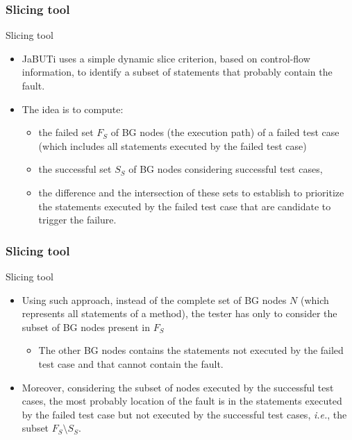 \begin{frame}
\frametitle{Slicing tool}

\begin{block:fact}{Slicing tool}
\begin{itemize}
	\item JaBUTi uses a simple dynamic slice criterion, based on
	control-flow information, to identify a subset of statements that
	probably contain the fault.

	\item The idea is to compute:
	\begin{itemize}
		\item the failed set $F_S$ of BG nodes (the execution path) of a
		failed test case (which includes all statements executed by the failed
		test case)

		\item the successful set $S_S$ of BG nodes considering successful test
		cases,

		\item the difference and the intersection of these sets to establish to
		prioritize the statements executed by the failed test case that are
		candidate to trigger the failure.
	\end{itemize}
\end{itemize}
\end{block:fact}
\end{frame}



\begin{frame}
\frametitle{Slicing tool}

\begin{block:fact}{Slicing tool}
\begin{itemize}
	\item Using such approach, instead of the complete set of BG nodes $N$
	(which represents all statements of a method), the tester has only to
	consider the subset of BG nodes present in $F_S$
	\begin{itemize}
		\item The other BG nodes contains the statements not executed by the
		failed test case and that cannot contain the fault.
	\end{itemize}

	\item Moreover, considering the subset of nodes executed by the successful
	test cases, the most probably location of the fault is in the
	statements executed by the failed test case but not executed by
	the successful test cases, \textit{i.e.}, the subset $F_S \setminus S_S$.
\end{itemize}
\end{block:fact}
\end{frame}



